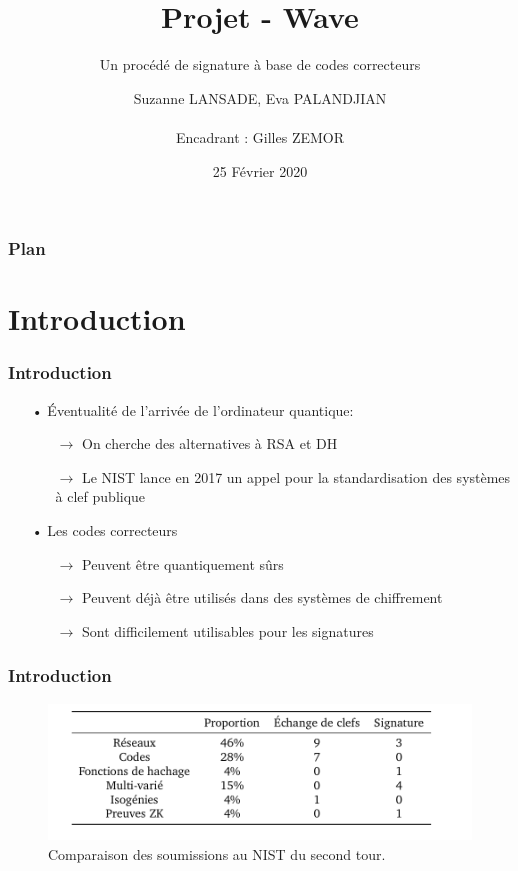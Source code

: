 \documentclass[10pt,a4paper]{beamer}
\title{Projet - Wave}
\subtitle{Un procédé de signature à base de codes correcteurs}
\author{ Suzanne LANSADE, Eva PALANDJIAN \\\quad\quad\quad\quad\quad \\Encadrant : Gilles ZEMOR}
\institute[Master CSI]{Master CSI, Université de Bordeaux, France}
\date{25 Février 2020}
\theoremstyle{plain}
\theoremstyle{definition}
\begin{document}
\begin{frame}
  \vspace{3.5em}
  \titlepage

\end{frame}

\begin{frame}
  \frametitle{Plan}
  \tableofcontents[subsectionstyle=hide]
\end{frame}

\section{Introduction}
\begin{frame}
\frametitle{Introduction}
\begin{itemize}
\item[•] Éventualité de l'arrivée de l'ordinateur quantique:
       \begin{itemize}
       \item[$\rightarrow$] On cherche des alternatives à RSA et DH 
       \item[$\rightarrow$] Le NIST lance en 2017 un appel pour la standardisation des systèmes à clef publique
       \end{itemize}
\vspace{0.2in}
\item[•] Les codes correcteurs
       \begin{itemize}
       \item[$\rightarrow$] Peuvent être quantiquement
        sûrs
       \item[$\rightarrow$] Peuvent déjà être utilisés dans des systèmes de chiffrement
       \item[$\rightarrow$] Sont difficilement utilisables pour les signatures
       \end{itemize}
\end{itemize}
\end{frame}

\begin{frame}
\frametitle{Introduction}
\begin{figure}[h]
\begin{center}
\includegraphics [scale=0.3]{../rapport/include/nist_second_tour.png}
\end{center}
\caption{\small Comparaison des soumissions au NIST du second tour.}
\end{figure}
\end{frame}
\end{document}
